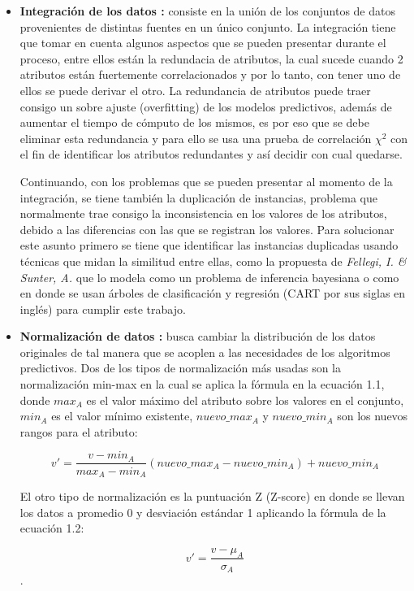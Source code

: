 \begin{itemize}
\item \textbf{Integración de los datos \cite{garcia2016data,batini1986comparative}:}
consiste en la unión de los conjuntos de datos provenientes de distintas fuentes en un único conjunto. La integración tiene que tomar en cuenta algunos aspectos que se pueden presentar durante el proceso, entre ellos están la redundacia de atributos, la cual sucede cuando 2 atributos están fuertemente correlacionados y por lo tanto, con tener uno de ellos se puede derivar el otro. La redundancia de atributos puede traer consigo un sobre ajuste (overfitting) de los modelos predictivos, además de aumentar el tiempo de cómputo de los mismos, es por eso que se debe eliminar esta redundancia y para ello se usa una prueba de correlación $\chi^2$ con el fin de identificar los atributos redundantes y así decidir con cual quedarse. 

Continuando, con los problemas que se pueden presentar al momento de la integración, se tiene también la duplicación de instancias, problema que normalmente trae consigo la inconsistencia en los valores de los atributos, debido a las diferencias con las que se registran los valores. Para solucionar este asunto primero se tiene que identificar las instancias duplicadas usando técnicas que midan la similitud entre ellas, como la propuesta de \emph{Fellegi, I. \& Sunter, A.} \cite{fellegi1969theory} que lo modela como un problema de inferencia bayesiana o como en \cite{cochinwala2001efficient} donde se usan árboles de clasificación y regresión (CART por sus siglas en inglés) para cumplir este trabajo.

\item \textbf{Normalización de datos \cite{garcia2016data}:}
busca cambiar la distribución de los datos originales de tal manera que se acoplen a las necesidades de los algoritmos predictivos. Dos de los tipos de normalización más usadas son la normalización min-max en la cual se aplica la fórmula en la ecuación 1.1, donde $max_A$ es el valor máximo del atributo sobre los valores en el conjunto, $min_A$ es el valor mínimo existente, $nuevo\_max_A$ y $nuevo\_min_A$ son los nuevos rangos para el atributo:

\begin{equation}
v' = \frac{v-min_A}{max_A-min_A}(nuevo\_max_A - nuevo\_min_A) + nuevo\_min_A
\end{equation}

El otro tipo de normalización es la puntuación Z (Z-score) en donde se llevan los datos a promedio 0 y desviación estándar 1 aplicando la fórmula de la ecuación 1.2:

\begin{equation}
v' = \frac{v-\mu_A}{\sigma_A}
\end{equation}
.\end{itemize}

